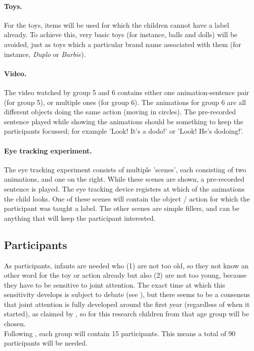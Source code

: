 \documentclass[12pt]{article}
\begin{document}
\paragraph{Toys.} For the toys, items will be used for which the children cannot have a label already. To achieve this, very basic toys (for instance, balls and dolls) will be avoided, just as toys which a particular brand name associated with them (for instance, \emph{Duplo} or \emph{Barbie}).
\paragraph{Video.} The video watched by group 5 and 6 contains either one animation-sentence pair (for group 5), or multiple ones (for group 6). The animations for group 6 are all different objects doing the same action (moving in circles). The pre-recorded sentence played while showing the animations should be something to keep the participants focussed; for example 'Look! It's a dodo!' or 'Look! He's dodoing!'.
\paragraph{Eye tracking experiment. } The eye tracking experiment consists of multiple 'scenes', each consisting of two animations, and one on the right. While these scenes are shown, a pre-recorded sentence is played. The eye tracking device registers at which of the animations the child looks. One of these scenes will contain the object / action for which the participant was taught a label. The other scenes are simple fillers, and can be anything that will keep the participant interested.

\subsection{Participants}
As participants, infants are needed who (1) are not too old, so they not know an other word for the toy or action already but also (2) are not too young, because they have to be sensitive to joint attention. The exact time at which this sensitivity develops is subject to debate (see \citet{dd04}), but there seems to be a consensus that joint attention is fully developed around the first year (regardless of when it started), as claimed by \citet{t92}, so for this research children from that age group will be chosen. \\\indent
Following \citet{ddc93}, each group will contain 15 participants. This means a total of 90 participants will be needed.
\end{document}
